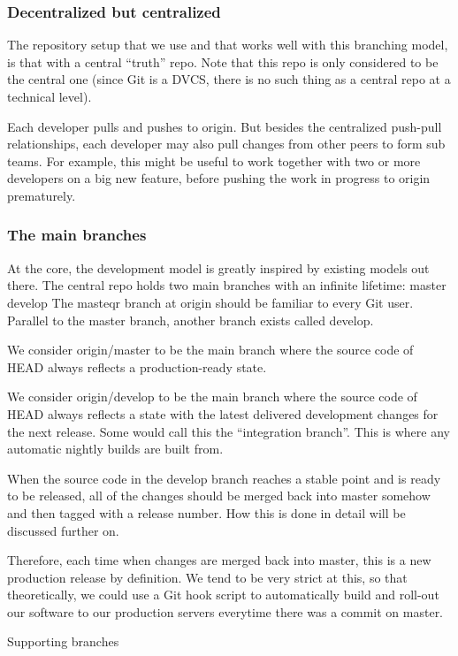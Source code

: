 \subsubsection{Decentralized but centralized}
The repository setup that we use and that works well with this branching model,
is that with a central “truth” repo. Note that this repo is only considered to be
the central one (since Git is a DVCS, there is no such thing as a central repo at
a technical level).

Each developer pulls and pushes to origin. But besides the centralized push-pull
relationships, each developer may also pull changes from other peers to form sub
teams. For example, this might be useful to work together with two or more
developers on a big new feature, before pushing the work in progress to origin
prematurely.

\subsubsection{The main branches}

At the core, the development model is greatly inspired by existing models out
there. The central repo holds two main branches with an infinite lifetime:
  master develop
The masteqr branch at origin should be familiar to every Git user. Parallel to
the master branch, another branch exists called develop.

We consider origin/master to be the main branch where the source code of HEAD
always reflects a production-ready state.

We consider origin/develop to be the main branch where the source code of HEAD
always reflects a state with the latest delivered development changes for the
next release. Some would call this the “integration branch”. This is where any
automatic nightly builds are built from.

When the source code in the develop branch reaches a stable point and is ready to
be released, all of the changes should be merged back into master somehow and
then tagged with a release number. How this is done in detail will be discussed
further on.

Therefore, each time when changes are merged back into master, this is a new
production release by definition. We tend to be very strict at this, so that
theoretically, we could use a Git hook script to automatically build and roll-out
our software to our production servers everytime there was a commit on master.

Supporting branches

